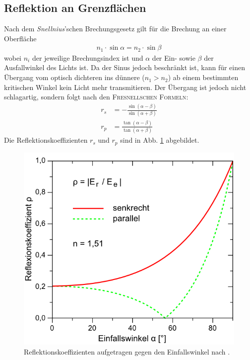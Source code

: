 \documentclass[12pt,a4paper,titlepage,headinclude,bibtotoc]{scrartcl}
\begin{document}
\subsection{Reflektion an Grenzflächen}
Nach dem \textit{Snellnius}'schen Brechungsgesetz gilt für die Brechung an einer Oberfläche
\begin{align}
	n_1\cdot\sin\alpha=n_2\cdot\sin\beta\label{eq:snellnius}
\end{align}
wobei $n_i$ der jeweilige Brechungsindex ist und $\alpha$ der Ein- sowie $\beta$ der Ausfallwinkel des Lichts ist.
Da der Sinus jedoch beschränkt ist, kann für einen Übergang vom optisch dichteren ins dünnere ($n_1 > n_2$) ab einem bestimmten kritischen Winkel kein Licht mehr transmitieren.
Der Übergang ist jedoch nicht schlagartig, sondern folgt nach \cite[S. 238]{demtroeder2} den \textsc{Fresnellschen Formeln}:
\begin{align}
	r_s &= -\frac{\sin (\alpha -\beta )}{\sin ( \alpha + \beta )}\label{eq:rs}\\
	r_p &= \frac{\tan (\alpha - \beta )}{\tan ( \alpha + \beta )}\label{eq:rp}
\end{align}
Die Reflektionskoeffizienten $r_s$ und $r_p$ sind in Abb. \ref{fig:reflektion} abgebildet.


\begin{figure}[h]
	\centering
	\includegraphics{fresnelkoeff_lp}
	\caption{Reflektionskoeffizienten aufgetragen gegen den Einfallswinkel nach \cite[28.3.2015, 15 Uhr]{lp20}.}
	\label{fig:reflektion}
\end{figure}
\end{document}
